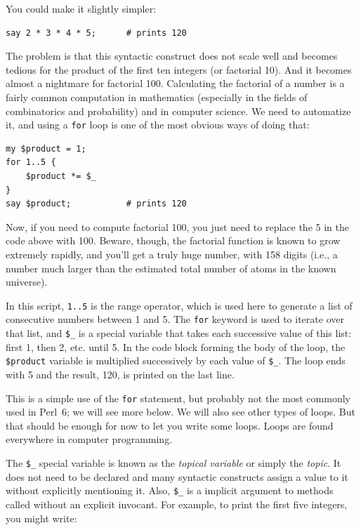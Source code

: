 You could make it slightly simpler:
\begin{verbatim}
say 2 * 3 * 4 * 5;      # prints 120
\end{verbatim}
%

The problem is that this syntactic construct does 
not scale well and becomes tedious for the product of the first 
ten integers (or factorial 10). And it becomes almost a 
nightmare for factorial 100. 
Calculating the factorial of a number is a fairly common computation 
in mathematics (especially in the fields of combinatorics 
and probability) and in computer science. We need to 
automatize it, and using a {\tt for} 
loop is one of the most obvious ways of doing that:

\begin{verbatim}
my $product = 1;
for 1..5 {
    $product *= $_
}
say $product;           # prints 120
\end{verbatim}

Now, if you need to compute factorial 100, you just need to 
replace the 5 in the code above with 100. Beware, though, 
the factorial function is known to grow extremely rapidly, 
and you'll get a truly huge number, with 158 digits 
(i.e., a number much larger than the estimated total 
number of atoms in the known universe).

In this script, {\tt 1..5} is the range operator, which is used here 
to generate a list of consecutive numbers between 1 and 5. The 
{\tt for} keyword is used to iterate over that list, and  
\verb"$_" is a special variable that takes each successive 
value of this list: first 1, then 2, etc. until 5. In the code 
block forming the body of the loop, the {\tt \$product} variable 
is multiplied successively by each value of \verb"$_". The loop 
ends with 5 and the result, 120, is printed on the last line.

This is a simple use of the {\tt for} statement, 
but probably not the most commonly used in Perl~6; 
we will see more below. We will also see other types of loops. 
But that should be enough for now to let you write some loops. Loops 
are found everywhere in computer programming.

The \verb"$_" special variable is known as the \emph{topical 
variable} or simply the \emph{topic}. It does not need to be declared 
and many syntactic constructs assign a value to it without 
explicitly mentioning it. Also, \verb"$_" is a implicit argument 
to methods called without an explicit invocant. For example, 
to print the first five integers, you might write:

